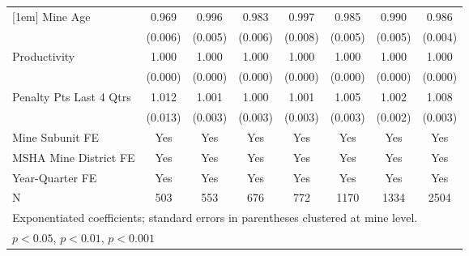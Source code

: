 {\begin{tabular}{l*{7}{c}}
[1em]
Mine Age                 &       0.969\sym{***}&       0.996         &       0.983\sym{**} &       0.997         &       0.985\sym{**} &       0.990         &       0.986\sym{***}\\
                         &     (0.006)         &     (0.005)         &     (0.006)         &     (0.008)         &     (0.005)         &     (0.005)         &     (0.004)         \\
[1em]
Productivity             &       1.000         &       1.000         &       1.000\sym{*}  &       1.000         &       1.000         &       1.000\sym{*}  &       1.000         \\
                         &     (0.000)         &     (0.000)         &     (0.000)         &     (0.000)         &     (0.000)         &     (0.000)         &     (0.000)         \\
[1em]
Penalty Pts Last 4 Qtrs  &       1.012         &       1.001         &       1.000         &       1.001         &       1.005         &       1.002         &       1.008\sym{**} \\
                         &     (0.013)         &     (0.003)         &     (0.003)         &     (0.003)         &     (0.003)         &     (0.002)         &     (0.003)         \\
[1em]
Mine Subunit FE          &         Yes         &         Yes         &         Yes         &         Yes         &         Yes         &         Yes         &         Yes         \\
[1em]
MSHA Mine District FE    &         Yes         &         Yes         &         Yes         &         Yes         &         Yes         &         Yes         &         Yes         \\
[1em]
Year-Quarter FE          &         Yes         &         Yes         &         Yes         &         Yes         &         Yes         &         Yes         &         Yes         \\
\hline
N                        &         503         &         553         &         676         &         772         &        1170         &        1334         &        2504         \\
\hline\hline
\multicolumn{8}{l}{\footnotesize Exponentiated coefficients; standard errors in parentheses clustered at mine level.}\\
\multicolumn{8}{l}{\footnotesize \sym{*} \(p<0.05\), \sym{**} \(p<0.01\), \sym{***} \(p<0.001\)}\\
\end{tabular}
}
